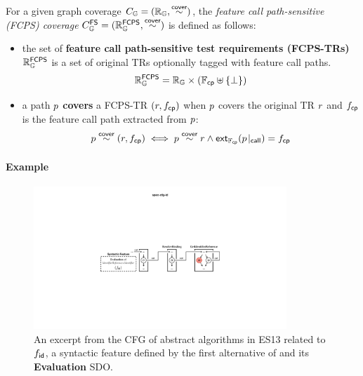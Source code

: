 
\begin{definition}\label{def:fcps-cov}
  For a given graph coverage $C_{\mathbb{G}} = (\mathbb{R}_{\mathbb{G}}, \overset{\textsf{cover}}{\sim})$, the
  \textit{feature call path-sensitive (FCPS) coverage} $C_{\mathbb{G}}^{\textsf{FS}} =
  (\mathbb{R}_{\mathbb{G}}^{\textsf{FCPS}}, \overset{\textsf{cover}}{\sim})$ is defined as follows:
  \begin{itemize}
    \item the set of \textbf{feature call path-sensitive test requirements
      (FCPS-TRs)} $\mathbb{R}_{\mathbb{G}}^{\textsf{FCPS}}$ is a set of original TRs optionally tagged
      with feature call paths.
      \[
        \mathbb{R}_{\mathbb{G}}^{\textsf{FCPS}} = \mathbb{R}_{\mathbb{G}} \times (\mathbb{F}_{\textsf{cp}} \uplus \{ \bot \})
      \]
    \item a path $p$ \textbf{covers} a FCPS-TR $(r, f_{\textsf{cp}})$ when $p$
      covers the original TR $r$ and $f_{\textsf{cp}}$ is the feature call path extracted
      from $p$:
      \[
        p \overset{\textsf{cover}}{\sim} (r, f_{\textsf{cp}}) \iff p \overset{\textsf{cover}}{\sim} r \wedge
        \textsf{ext}_{\mathbb{F}_{\textsf{cp}}}({p}\!\mid_{\textsf{call}}) = f_{\textsf{cp}}
      \]
  \end{itemize}
\end{definition}


\paragraph{\textbf{Example}}

\begin{figure}
  \includegraphics[width=0.85\textwidth]{img/spec-cfg-id}
  \caption{
    An excerpt from the CFG of abstract algorithms in ES13 related to $f_{\textsf{id}}$,
    a syntactic feature defined by the first alternative of
     and its \textbf{Evaluation} SDO.
  }
  \label{fig:spec-cfg-id}
\end{figure}

